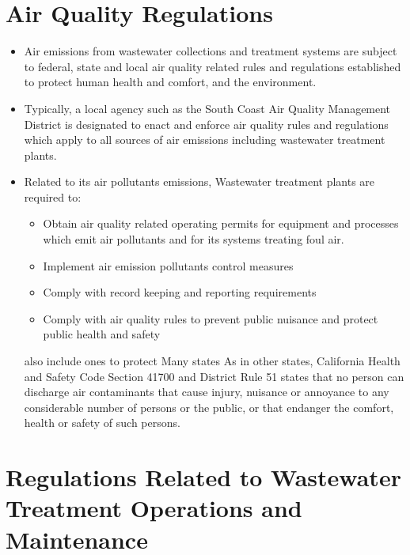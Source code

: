 \documentclass{article}
\begin{document}
\section{Air Quality Regulations}
\begin{itemize}
\item Air emissions from wastewater collections and treatment systems are subject to federal, state and local air quality related rules and regulations established to protect human health and comfort, and the environment.  
\item Typically, a local agency such as the South Coast Air Quality Management District is designated to enact and enforce air quality rules and regulations which apply to all sources of air emissions including wastewater treatment plants.
  
\item Related to its air pollutants emissions, Wastewater treatment plants are required to:
\begin{itemize}
\item Obtain air quality related operating permits for equipment and processes which emit air pollutants and for its systems treating foul air.
\item Implement air emission pollutants control measures
\item Comply with record keeping and reporting requirements
\item Comply with air quality rules to prevent public nuisance and protect public health and safety
\end{itemize}

also include ones to protect Many states As in other states, California Health and Safety Code Section 41700 and District Rule 51 states that no person can discharge air contaminants that cause injury, nuisance or annoyance to any considerable number of persons or the public, or that endanger the comfort, health or safety of such persons.

\end{itemize}

\section{Regulations Related to Wastewater Treatment Operations and Maintenance}
\end{document}
